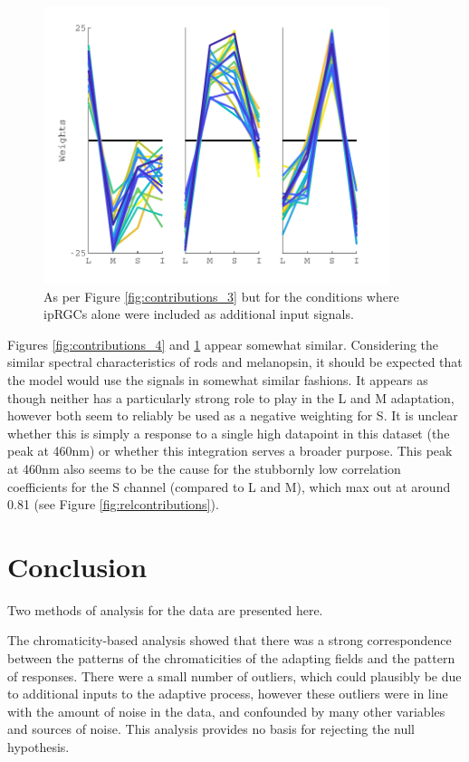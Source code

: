 \begin{figure}[htbp]
\includegraphics[max width=0.9\textwidth]{figs/LargeSphere/contributions_5minusrods.pdf}
\caption{As per Figure \ref{fig:contributions_3} but for the conditions where ipRGCs alone were included as additional input signals.} 
\label{fig:contributions_5minusrods}
\end{figure}

Figures \ref{fig:contributions_4} and \ref{fig:contributions_5minusrods} appear somewhat similar. Considering the similar spectral characteristics of rods and melanopsin, it should be expected that the model would use the signals in somewhat similar fashions. It appears as though neither has a particularly strong role to play in the L and M adaptation, however both seem to reliably be used as a negative weighting for S. It is unclear whether this is simply a response to a single high datapoint in this dataset (the peak at 460nm) or whether this integration serves a broader purpose. This peak at 460nm also seems to be the cause for the stubbornly low correlation coefficients for the S channel (compared to L and M), which max out at around 0.81 (see Figure \ref{fig:relcontributions}).

\section{Conclusion}
\label{sec:LSdis}

Two methods of analysis for the \citet{macdonald_chromatic_2013} data are presented here.

The chromaticity-based analysis showed that there was a strong correspondence between the patterns of the chromaticities of the adapting fields and the pattern of responses. There were a small number of outliers, which could plausibly be due to additional inputs to the adaptive process, however these outliers were in line with the amount of noise in the data, and confounded by many other variables and sources of noise. This analysis provides no basis for rejecting the null hypothesis.

